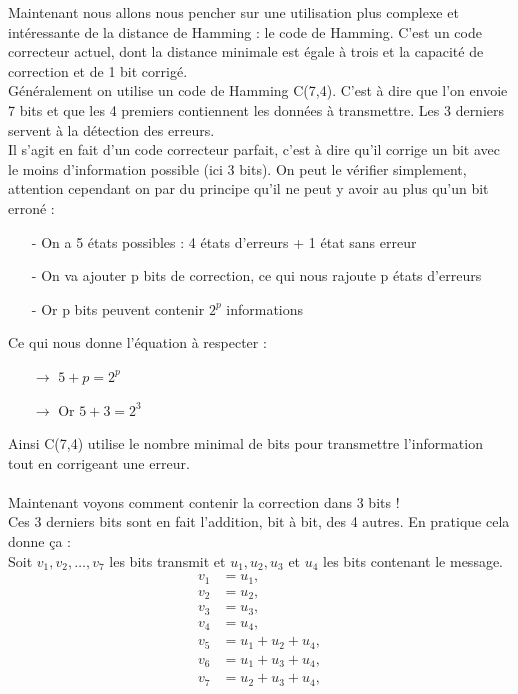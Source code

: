 \documentclass[12pt]{article}
\begin{document}
Maintenant nous allons nous pencher sur une utilisation plus complexe et intéressante de la distance de Hamming : le code de Hamming. C’est un code correcteur actuel, dont la distance minimale est égale à trois et la capacité de correction et de 1 bit corrigé.\\


\tab Généralement on utilise un code de Hamming C(7,4). C'est à dire que l'on envoie 7 bits et que les 4 premiers contiennent les données à transmettre. Les 3 derniers servent à la détection des erreurs.\\

\tab Il s'agit en fait d'un code correcteur parfait, c'est à dire qu'il corrige un bit avec le moins d'information possible (ici 3 bits). On peut le vérifier simplement, attention cependant on par du principe qu'il ne peut y avoir au plus qu'un bit erroné :
\begin{enumerate}
  \item[-] On a 5 états possibles : 4 états d'erreurs + 1 état sans erreur
  \item[-] On va ajouter p bits de correction, ce qui nous rajoute p états d'erreurs
  \item[-] Or p bits peuvent contenir $2^p$ informations
\end{enumerate}
Ce qui nous donne l'équation à respecter :
\begin{enumerate}
  \item[$\rightarrow$] $ 5 + p = 2^p$
  \item[$\rightarrow$] Or $ 5 + 3 = 2^3$
\end{enumerate}
Ainsi C(7,4) utilise le nombre minimal de bits pour transmettre l'information tout en corrigeant une erreur.
\\
\\ Maintenant voyons comment contenir la correction dans 3 bits !
\\ Ces 3 derniers bits sont en fait l'addition, bit à bit, des 4 autres. En pratique cela donne ça :
\\ Soit $v_1, v_2, \ldots, v_7$ les bits transmit et $u_1, u_2, u_3$ et $u_4$ les bits contenant le message.
\begin{align*}
  v_1 &= u_1,\\
  v_2 &= u_2,\\
  v_3 &= u_3,\\
  v_4 &= u_4,\\
  v_5 &= u_1 + u_2 + u_4,\\
  v_6 &= u_1 + u_3 + u_4,\\
  v_7 &= u_2 + u_3 + u_4,
\end{align*}
\end{document}
